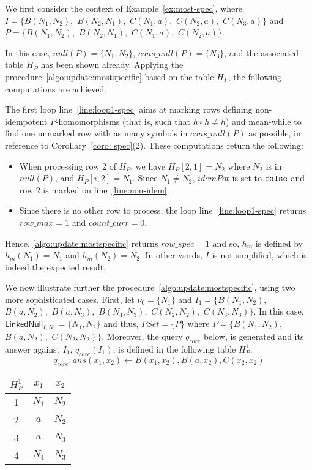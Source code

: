 \begin{example}
    \label{ex:most-spec-DL}
    We first consider the context of Example~\ref{ex:most-spec}, where $I=\{B(N_1,N_2),$ $B(N_2,N_1),$ $C(N_1,a),$ $C(N_2,a),$ $C(N_3,a)\}$ and
    $P=\{B(N_1,N_2),$ $B(N_2,N_1),$ $C(N_1,a),$ $C(N_2,a)\}$.

    In this case, $null(P)=\{N_1, N_2\}$, $cons\_null(P)=\{N_3\}$, and the associated table $H_P$ has been shown already.
    Applying the procedure~\ref{algo:update:mostspecific} based on the table $H_P$, the following computations are achieved.

    The first loop line~\ref{line:loop1-spec} aims at marking rows defining non-idempotent $P$-homomorphisms (that is, such that $h \circ h \ne h$) and mean-while to find one unmarked row with as many symbols in $cons\_null(P)$ as possible, in reference to Corollary~\ref{coro: spec}(2).
    These computations return the following:
    \begin{itemize}
        \item When processing row $2$ of $H_P$, we have $H_P[2,1]=N_2$ where $N_2$ is in $null(P)$, and $H_P[i,2]=N_1$.
              Since $N_1 \ne N_2$, $idemPot$ is set to ${\tt false}$ and row $2$ is marked on line~\ref{line:non-idem}.

        \item Since there is no other row to process, the loop line~\ref{line:loop1-spec} returns $row\_max = 1$ and $count\_curr =0$.
    \end{itemize}
    Hence, \ref{algo:update:mostspecific} returns $row\_spec=1$ and so, $h_m$ is defined by $h_m(N_1)=N_1$ and $h_m(N_2)=N_2$.
    In other words, $I$ is not simplified, which is indeed the expected result.

    We now illustrate further the procedure~\ref{algo:update:mostspecific}, using two more sophisticated cases.
    First, let $\nu_0=\{N_1\}$ and $I_1=\{B(N_1, N_2),$ $B(a, N_2),$ $B(a,N_3),$ $B(N_4,N_3),$ $C(N_2,N_2),$ $C(N_3,N_3)\}$.
    In this case, $\textsf{LinkedNull}_{I,N_1}=\{N_1,N_2\}$ and thus, $PSet = \{P\}$ where $P=\{B(N_1, N_2),$ $B(a,N_2),$ $C(N_2,N_2)\}$.
    Moreover, the query $q_{core}$ below, is generated and its answer against $I_1$, $q_{core}(I_1)$, is defined in the following table $H^1_P$:
    \[
        q_{core}:ans(x_1,x_2) \leftarrow B(x_1, x_2), B(a,x_2),C(x_2,x_2)
    \]

    \begin{center}
        \begin{tabular}{c|cc}
            $H_P^1$ & $x_1$  & $x_2$  \\ \hline
            1       & $N_1 $ & $N_2$  \\
            2       & $a$    & $N_2$  \\
            3       & $a$    & $ N_3$ \\
            4       & $N_4$  & $ N_3$ \\
        \end{tabular}
    \end{center}


\end{example}
